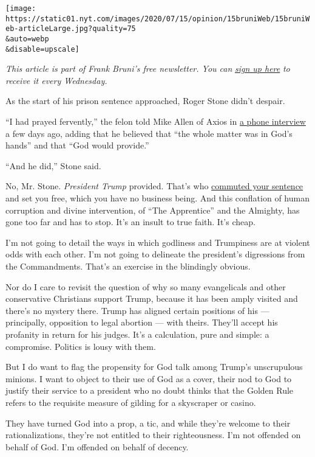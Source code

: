 \texttt{[image: https://static01.nyt.com/images/2020/07/15/opinion/15bruniWeb/15bruniWeb-articleLarge.jpg?quality=75\\\&auto=webp\\\&disable=upscale]}

\emph{This article is part of Frank Bruni's free newsletter. You can}
\href{https://www.nytimes.com/newsletters/frank-bruni}{\emph{sign up
here}} \emph{to receive it every Wednesday.}

As the start of his prison sentence approached, Roger Stone didn't
despair.

``I had prayed fervently,'' the felon told Mike Allen of Axios in
\href{https://www.axios.com/roger-stone-interview-campaign-trump-37b8e1d9-cd72-47ea-8401-801b99d1ea0f.html}{a
phone interview} a few days ago, adding that he believed that ``the
whole matter was in God's hands'' and that ``God would provide.''

``And he did,'' Stone said.

No, Mr. Stone. \emph{President Trump} provided. That's who
\href{https://www.nytimes.com/2020/07/10/us/politics/trump-roger-stone-clemency.html}{commuted
your sentence} and set you free, which you have no business being. And
this conflation of human corruption and divine intervention, of ``The
Apprentice'' and the Almighty, has gone too far and has to stop. It's an
insult to true faith. It's cheap.

I'm not going to detail the ways in which godliness and Trumpiness are
at violent odds with each other. I'm not going to delineate the
president's digressions from the Commandments. That's an exercise in the
blindingly obvious.

Nor do I care to revisit the question of why so many evangelicals and
other conservative Christians support Trump, because it has been amply
visited and there's no mystery there. Trump has aligned certain
positions of his --- principally, opposition to legal abortion --- with
theirs. They'll accept his profanity in return for his judges. It's a
calculation, pure and simple: a compromise. Politics is lousy with them.

But I do want to flag the propensity for God talk among Trump's
unscrupulous minions. I want to object to their use of God as a cover,
their nod to God to justify their service to a president who no doubt
thinks that the Golden Rule refers to the requisite measure of gilding
for a skyscraper or casino.

They have turned God into a prop, a tic, and while they're welcome to
their rationalizations, they're not entitled to their righteousness. I'm
not offended on behalf of God. I'm offended on behalf of decency.

